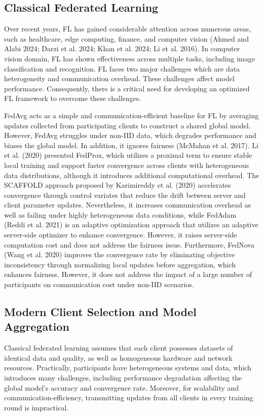 \documentclass[pdflatex,sn-mathphys-num,oneside]{sn-jnl}%
\theoremstyle{thmstyleone}%
\theoremstyle{thmstyletwo}%
\theoremstyle{thmstylethree}%
\begin{document}
\subsection{Classical Federated Learning}

Over recent years, FL has gained considerable attention across numerous areas, such as healthcare, edge computing, finance, and computer vision (Ahmed and Alabi 2024; Darzi et al. 2024; Khan et al. 2024; Li et al. 2016). In computer vision domain, FL has shown effectiveness across multiple tasks, including image classification and recognition. FL faces two major challenges which are data heterogeneity and communication overhead. These challenges affect model performance. Consequently, there is a critical need for developing an optimized FL framework to overcome these challenges.

FedAvg acts as a simple and communication-efficient baseline for FL by averaging updates collected from participating clients to construct a shared global model. However, FedAvg struggles under non-IID data, which degrades performance and biases the global model. In addition, it ignores fairness (McMahan et al. 2017). Li et al. (2020) presented FedProx, which utilizes a proximal term to ensure stable local training and support faster convergence across clients with heterogeneous data distributions, although it introduces additional computational overhead. The SCAFFOLD approach proposed by Karimireddy et al. (2020) accelerates convergence through control variates that reduce the drift between server and client parameter updates. Nevertheless, it increases communication overhead as well as failing under highly heterogeneous data conditions, while FedAdam (Reddi et al. 2021) is an adaptive optimization approach that utilizes an adaptive server-side optimizer to enhance convergence. However, it raises server-side computation cost and does not address the fairness issue. Furthermore, FedNova (Wang et al. 2020) improves the convergence rate by eliminating objective inconsistency through normalizing local updates before aggregation, which enhances fairness. However, it does not address the impact of a large number of participants on communication cost under non-IID scenarios. 

\subsection{Modern Client Selection and Model Aggregation}

Classical federated learning assumes that each client possesses datasets of identical data and quality, as well as homogeneous hardware and network resources. Practically, participants have heterogeneous systems and data, which introduces many challenges, including performance degradation affecting the global model's accuracy and convergence rate. Moreover, for scalability and communication-efficiency, transmitting updates from all clients in every training round is impractical.
\end{document}
